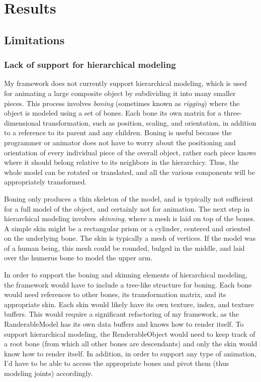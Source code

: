 \documentclass[journal]{IEEEtran}
\begin{document}
\section{Results}

\subsection{Limitations}

\subsubsection{Lack of support for hierarchical modeling}

My framework does not currently support hierarchical modeling, which is used for animating a large composite object by subdividing it into many smaller pieces. This process involves \textit{boning} (sometimes known as \textit{rigging}) where the object is modeled using a set of bones. Each bone its own matrix for a three-dimensional transformation, such as position, scaling, and orientation, in addition to a reference to its parent and any children. Boning is useful because the programmer or animator does not have to worry about the positioning and orientation of every individual piece of the overall object, rather each piece knows where it should belong relative to its neighbors in the hierarchicy. Thus, the whole model can be rotated or translated, and all the various components will be appropriately transformed.

Boning only produces a thin skeleton of the model, and is typically not sufficient for a full model of the object, and certainly not for animation. The next step in hierarchical modeling involves \textit{skinning}, where a mesh is laid on top of the bones. A simple skin might be a rectangular prism or a cylinder, centered and oriented on the underlying bone. The skin is typically a mesh of vertices. If the model was of a human being, this mesh could be rounded, bulged in the middle, and laid over the humerus bone to model the upper arm.

In order to support the boning and skinning elements of hierarchical modeling, the framework would have to include a tree-like structure for boning. Each bone would need references to other bones, its transformation matrix, and its appropriate skin. Each skin would likely have its own texture, index, and texture buffers. This would require a significant refactoring of my framework, as the RanderableModel has its own data buffers and knows how to render itself. To support hierarchical modeling, the RenderableObject would need to keep track of a root bone (from which all other bones are descendants) and only the skin would know how to render itself. In addition, in order to support any type of animation, I'd have to be able to access the appropriate bones and pivot them (thus modeling joints) accordingly.
\end{document}
